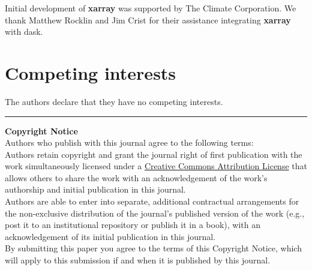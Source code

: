 \documentclass{jors}
\begin{document}
Initial development of \textbf{xarray} was supported by The Climate Corporation.
We thank Matthew Rocklin and Jim Crist for their assistance integrating \textbf{xarray}
with dask.

\section*{Competing interests}

The authors declare that they have no competing interests.



\vspace{2cm}

\rule{\textwidth}{1pt}

{ \bf Copyright Notice} \\
Authors who publish with this journal agree to the following terms: \\

Authors retain copyright and grant the journal right of first publication with the work simultaneously licensed under a  \href{http://creativecommons.org/licenses/by/3.0/}{Creative Commons Attribution License} that allows others to share the work with an acknowledgement of the work's authorship and initial publication in this journal. \\

Authors are able to enter into separate, additional contractual arrangements for the non-exclusive distribution of the journal's published version of the work (e.g., post it to an institutional repository or publish it in a book), with an acknowledgement of its initial publication in this journal. \\

By submitting this paper you agree to the terms of this Copyright Notice, which will apply to this submission if and when it is published by this journal.
\end{document}
